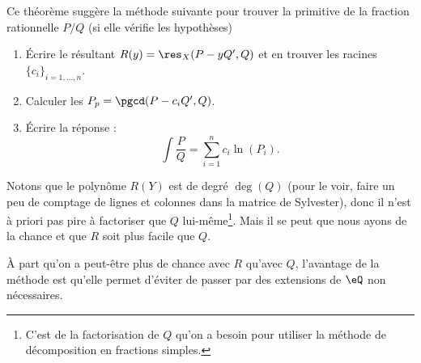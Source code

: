 Ce théorème suggère la méthode suivante pour trouver la primitive de la fraction rationnelle \( P/Q\) (si elle vérifie les hypothèses)
\begin{enumerate}
    \item
        Écrire le résultant \( R(y)=\res_X(P-yQ',Q)\) et en trouver les racines \( \{ c_i \}_{i=1,\ldots, n}\).
    \item
        Calculer les \( P_p=\pgcd(P-c_iQ',Q)\).
    \item
        Écrire la réponse :
        \begin{equation}
            \int\frac{ P }{ Q }=\sum_{i=1}^nc_i\ln(P_i).
        \end{equation}
\end{enumerate}

Notons que le polynôme \( R(Y)\) est de degré \( \deg(Q)\) (pour le voir, faire un peu de comptage de lignes et colonnes dans la matrice de Sylvester), donc il n'est à priori pas pire à factoriser que \( Q\) lui-même\footnote{C'est de la factorisation de \( Q\) qu'on a besoin pour utiliser la méthode de décomposition en fractions simples.}. Mais il se peut que nous ayons de la chance et que \( R\) soit plus facile que \( Q\).

À part qu'on a peut-être plus de chance avec \( R\) qu'avec \( Q\), l'avantage de la méthode est qu'elle permet d'éviter de passer par des extensions de \( \eQ\) non nécessaires.

